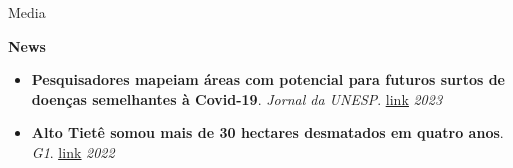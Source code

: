 \documentclass{resume}
\begin{document}
\begin{rSection}{Media}

{\bf News}
\begin{itemize} 
\item {\bf Pesquisadores mapeiam áreas com potencial para futuros surtos de doenças semelhantes à Covid-19}. {\it Jornal da UNESP}. \href{https://jornal.unesp.br/2022/06/23/pesquisadores-mapeiam-areas-com-potencial-para-futuros-surtos-de-doencas-semelhantes-a-covid-19/}{\underline{link}} \hfill{\em 2023}
\item {\bf Alto Tietê somou mais de 30 hectares desmatados em quatro anos}. {\it G1}. \href{https://g1.globo.com/sp/mogi-das-cruzes-suzano/noticia/2023/06/05/em-quatro-anos-alto-tiete-somou-mais-de-30-hectares-desmatados.ghtml}{\underline{link}} \hfill{\em 2022}
\end{itemize} 


\end{rSection}
\end{document}
